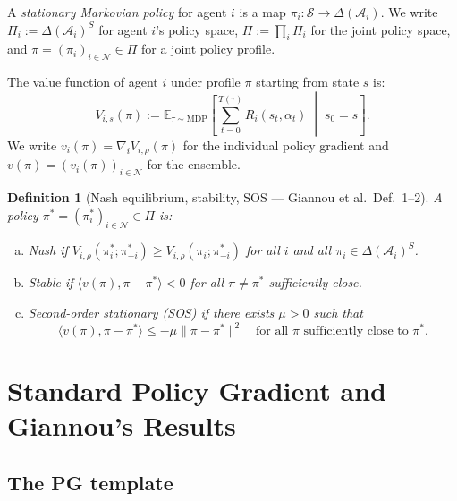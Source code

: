 \documentclass[11pt,a4paper]{article}
\newtheorem{definition}[theorem]{Definition}
\newcommand{\E}{\mathbb{E}}
\newcommand{\ip}[2]{\langle #1, #2 \rangle}
\begin{document}
A \emph{stationary Markovian policy} for agent $i$ is a map $\pi_i : \mathcal{S} \to \Delta(\mathcal{A}_i)$. We write $\Pi_i := \Delta(\mathcal{A}_i)^S$ for agent $i$'s policy space, $\Pi := \prod_i \Pi_i$ for the joint policy space, and $\pi = (\pi_i)_{i \in \mathcal{N}} \in \Pi$ for a joint policy profile.

The value function of agent $i$ under profile $\pi$ starting from state $s$ is:
\begin{equation}
    V_{i,s}(\pi) := \E_{\tau \sim \text{MDP}} \left[ \sum_{t=0}^{T(\tau)} R_i(s_t, \alpha_t) \;\middle|\; s_0 = s \right].
\end{equation}
We write $v_i(\pi) = \nabla_i V_{i,\rho}(\pi)$ for the individual policy gradient and $v(\pi) = (v_i(\pi))_{i \in \mathcal{N}}$ for the ensemble.

\begin{definition}[Nash equilibrium, stability, SOS --- Giannou et al.\ Def.\ 1--2]
\label{def:nash}
A policy $\pi^* = (\pi_i^*)_{i \in \mathcal{N}} \in \Pi$ is:
\begin{enumerate}[(a)]
    \item \emph{Nash} if $V_{i,\rho}(\pi_i^*; \pi_{-i}^*) \geq V_{i,\rho}(\pi_i; \pi_{-i}^*)$ for all $i$ and all $\pi_i \in \Delta(\mathcal{A}_i)^S$.
    \item \emph{Stable} if $\ip{v(\pi)}{\pi - \pi^*} < 0$ for all $\pi \neq \pi^*$ sufficiently close.
    \item \emph{Second-order stationary (SOS)} if there exists $\mu > 0$ such that
    \begin{equation}
    \label{eq:sos}
        \ip{v(\pi)}{\pi - \pi^*} \leq -\mu \|\pi - \pi^*\|^2 \quad \text{for all } \pi \text{ sufficiently close to } \pi^*.
    \end{equation}
\end{enumerate}
\end{definition}


\section{Standard Policy Gradient and Giannou's Results}
\label{sec:standard-pg}

\subsection{The PG template}
\end{document}
